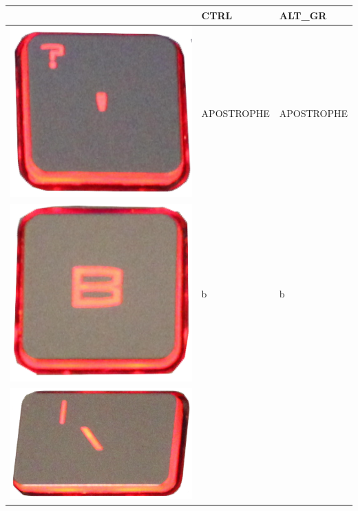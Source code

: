 \begin{longtable}{|cll|}
\begin{minipage}[c]{.4\textwidth}
\vspace{0.2cm}
\end{minipage} & CTRL & ALT\_GR\\
\hline
\begin{minipage}[c]{.4\textwidth}
\vspace{0.2cm}
\includegraphics[scale=0.08]{Images/KeyMapping/APOSTROPHE}
\vspace{0.2cm}
\end{minipage} & APOSTROPHE & APOSTROPHE\\
\hline
\begin{minipage}[c]{.4\textwidth}
\vspace{0.2cm}
\includegraphics[scale=0.08]{Images/KeyMapping/b}
\vspace{0.2cm}
\end{minipage} & b & b\\
\hline
\begin{minipage}[c]{.4\textwidth}
\vspace{0.2cm}
\includegraphics[scale=0.08]{Images/KeyMapping/BACKSLASH}

\end{minipage}
\end{longtable}
